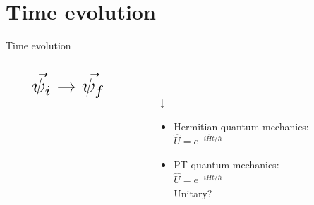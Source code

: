 \documentclass[10pt]{beamer}
\newcommand*{\Scale}[2][4]{\scalebox{#1}{\ensuremath{#2}}}%
\begin{document}
\section{Time evolution}
\begin{frame}{Time evolution}
\vspace{-1cm}
\hspace{-2em}
\vspace{2cm}
\begin{columns}[T]
    \begin{column}{0.3\textwidth}
    \vspace{-2cm}
    \begin{align*}
    &\Scale[2]{\vec{\psi_{i}} \rightarrow{} \vec{\psi_{f}}}
    \end{align*}
    \pause
    \hspace{6em}
    \Scale[2.2]{\hookrightarrow}
    \end{column}
    
    \begin{column}{0.8\textwidth}
    \vspace{-1.1cm}
    \Scale[3]{\vec{\psi_{f}} = \hat{U} \vec{\psi_{i}}}\\
    \pause
    \hspace{6.8em}
    \begin{huge}
    {$\downarrow$}\\
    \end{huge}
    \begin{itemize}
    \item \textcolor{myNewColorA}{Hermitian} quantum mechanics:\\
    \hspace{5em}
    $\hat{U} = e^{-i\hat{H}t / \hbar}$\\
    \hspace{5em}
    \pause
    \item \textcolor{myNewColorC}{PT} quantum mechanics:\\ 
    \hspace{5em}
    $\hat{U} = e^{-i\tilde{H}t / \hbar}$\\
    \hspace{5em}
    \pause
    \textcolor{myNewColorC}{\large{Unitary?}}
    \end{itemize}
    \end{column}
    \end{columns}
\end{frame}
\end{document}

